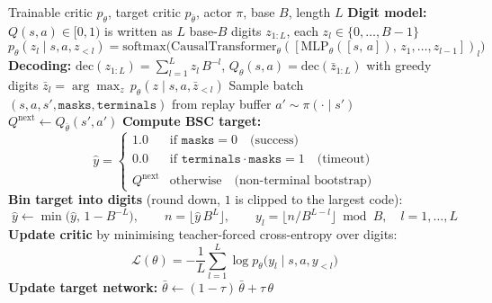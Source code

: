 \documentclass{article}
\begin{document}
\begin{algorithm}
\caption{Autoregressive-Binning Critic TD}
\label{alg:arb-td}
\begin{algorithmic}[1]
\Require Trainable critic $p_\theta$, target critic $p_{\bar\theta}$, actor $\pi$, base $B$, length $L$
\Statex \textbf{Digit model:} $Q(s, a) \in [0, 1)$ is written as $L$ base-$B$ digits $z_{1:L}$, each $z_l \in \{0, \dots, B-1\}$
\[
  p_\theta(z_l \mid s, a, z_{<l}) = \mathrm{softmax}\big(\mathrm{CausalTransformer}_\theta([\mathrm{MLP}_\theta([s,\, a]),\, z_1, \dots, z_{l-1}])_l\big)
\]
\Statex \textbf{Decoding:} $\mathrm{dec}(z_{1:L}) = \sum_{l=1}^{L} z_l\, B^{-l}$, \quad
  $Q_\theta(s, a) = \mathrm{dec}(\bar z_{1:L})$ with greedy digits $\bar z_l = \arg\max_{z}\, p_\theta(z \mid s, a, \bar z_{<l})$
\Repeat
  \State Sample batch $(s, a, s', \texttt{masks}, \texttt{terminals})$ from replay buffer
  \State $a' \sim \pi(\cdot \mid s')$
  \State $Q^{\text{next}} \gets Q_{\bar\theta}(s', a')$ 
  \State \textbf{Compute BSC target:}
  \[
    \hat{y} =
    \begin{cases}
      1.0        & \text{if } \texttt{masks} = 0 \quad \text{(success)} \\
      0.0        & \text{if } \texttt{terminals} \cdot \texttt{masks} = 1 \quad \text{(timeout)} \\
      Q^{\text{next}} & \text{otherwise} \quad \text{(non-terminal bootstrap)}
    \end{cases}
  \]
  \State \textbf{Bin target into digits} (round down, $1$ is clipped to the largest code):
  \[
    \hat{y} \gets \min\big(\hat{y},\, 1 - B^{-L}\big), \qquad
    n = \big\lfloor \hat{y}\, B^{L} \big\rfloor, \qquad
    y_l = \big\lfloor n / B^{L-l} \big\rfloor \bmod B, \quad l = 1, \dots, L
  \]
  \State \textbf{Update critic} by minimising teacher-forced cross-entropy over digits:
  \[
    \mathcal{L}(\theta) = -\frac{1}{L} \sum_{l=1}^{L} \log p_\theta\big(y_l \mid s, a, y_{<l}\big)
  \]
  \State \textbf{Update target network:} $\bar\theta \gets (1 - \tau)\,\bar\theta + \tau\,\theta$
\end{algorithmic}
\end{algorithm}
\end{document}
